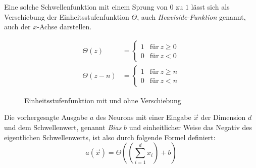 \documentclass[12pt,titlepage]{article}
\begin{document}

Eine solche Schwellenfunktion mit einem Sprung von $0$ zu $1$ lässt sich als Verschiebung der Einheitsstufenfunktion $\Theta$, auch \textit{Heaviside-Funktion} genannt, auch der $x$-Achse darstellen.

\begin{align*}
  \Theta(z)   & = \begin{cases}
                    1 & \text{für} \ z \geq 0 \\
                    0 & \text{für} \ z < 0
                  \end{cases} \\
  \Theta(z-n) & = \begin{cases}
                    1 & \text{für} \ z \geq n \\
                    0 & \text{für} \ z < n
                  \end{cases}
\end{align*}

\begin{figure}[H]
  \centering


  \caption{Einheitsstufenfunktion mit und ohne Verschiebung}
  \label{fig:Heaviside}
\end{figure}

Die vorhergesagte Ausgabe \(a\) des Neurons mit einer Eingabe \(\vec{x}\) der Dimension $d$ und dem Schwellenwert, genannt \textit{Bias} \(b\) und einheitlicher Weise das Negativ des eigentlichen Schwellenwerts, ist also durch folgende Formel definiert:
\[
  a(\vec{x}) = \Theta \left( \left( \sum_{i=1}^{d} x_i \right) + b \right)
\]
\end{document}
